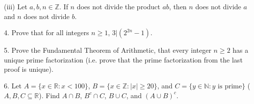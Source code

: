 \documentclass{article}
\theoremstyle{remark} %
\newcommand{\R}{{\mathbb{R}}}
\newcommand{\Z}{{\mathbb{Z}}}
\newcommand{\N}{{\mathbb{N}}}
\begin{document}
\vspace{7cm} %




(iii) Let $a,b,n \in \Z$. If $n$ does not divide the product $ab$, then $n$ does not divide $a$ and $n$ does not divide $b$.

\vspace{7cm} %




4. Prove that for all integers $n \geq 1$, $3|(2^{2n}-1)$.

\vspace{12cm} %




5. Prove the Fundamental Theorem of Arithmetic, that every integer $n \geq 2$ has a unique prime factorization (i.e. prove that the prime factorization from the last proof is unique).

\vspace{13cm} %




6. Let $A = \{x\in \R : x <100\}$, $B = \{x\in \Z : |x| \geq 20\}$, and $C = \{y \in \N : y \text{ is prime}\}$ ($A,B,C \subseteq \R$). Find $A \cap B$, $B^c \cap C$, $B \cup C$, and $(A \cup B )^c$.


\vspace{11cm} %

\end{document}
